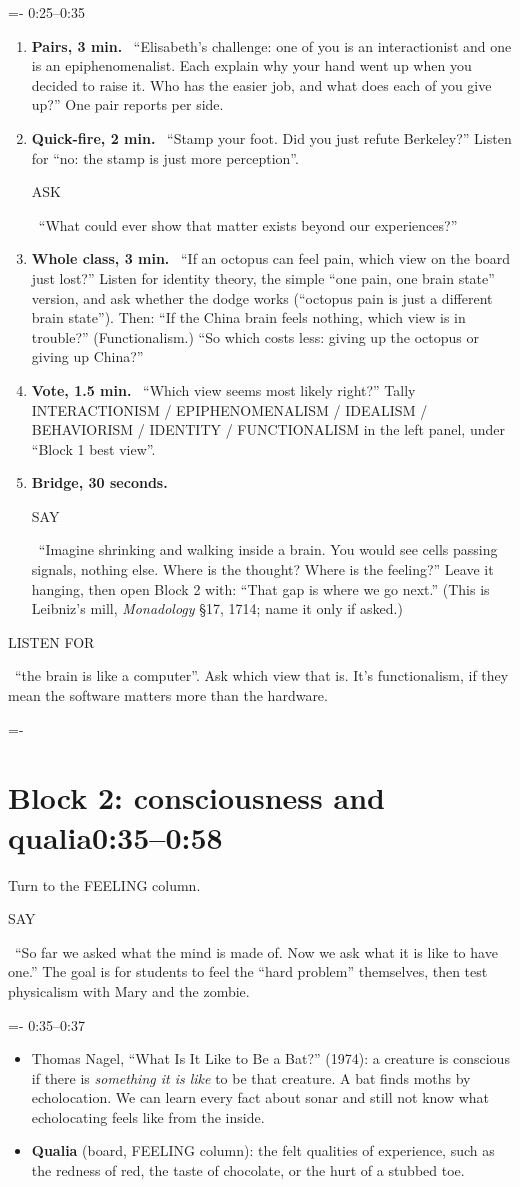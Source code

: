 \documentclass[11pt,letterpaper]{article}
\makeatletter
\newcommand{\keep}[1]{\par\penalty\z@\begingroup\dimen@=#1\relax\dimen@ii=\pagegoal\advance\dimen@ii-\pagetotal
  \ifdim\dimen@>\dimen@ii\ifdim\dimen@ii>\z@\vfil\break\fi\fi\endgroup}
\newcommand{\block}[2]{\keep{6\baselineskip}\section[#1]{#1\hfill{\normalsize\mdseries\color{muted}#2}}}
\newcommand{\beat}[2]{\keep{3\baselineskip}\vspace{5pt}\noindent{\sffamily\bfseries #1}\hfill{\sffamily\small\color{muted}#2}\par\nopagebreak\vspace{1pt}}
\newcommand{\tagbox}[1]{\colorbox{tagbg}{\sffamily\scriptsize\bfseries\color{accent}\strut #1}}
\newcommand{\say}{\tagbox{SAY}\ }
\newcommand{\ask}{\tagbox{ASK}\ }
\newcommand{\listen}{\tagbox{LISTEN FOR}\ }
\newcommand{\dur}[1]{\textsf{\bfseries\small #1.}\ }
\makeatother
\begin{document}
\beat{Discussion}{0:25--0:35}
\begin{enumerate}
\item \dur{Pairs, 3 min} ``Elisabeth's challenge: one of you is an interactionist and one is an epiphenomenalist. Each explain why your hand went up when you decided to raise it. Who has the easier job, and what does each of you give up?'' One pair reports per side.
\item \dur{Quick-fire, 2 min} ``Stamp your foot. Did you just refute Berkeley?'' Listen for ``no: the stamp is just more perception''. \ask ``What could ever show that matter exists beyond our experiences?''
\item \dur{Whole class, 3 min} ``If an octopus can feel pain, which view on the board just lost?'' Listen for identity theory, the simple ``one pain, one brain state'' version, and ask whether the dodge works (``octopus pain is just a different brain state''). Then: ``If the China brain feels nothing, which view is in trouble?'' (Functionalism.) ``So which costs less: giving up the octopus or giving up China?''
\item \dur{Vote, 1.5 min} ``Which view seems most likely right?'' Tally INTERACTIONISM / EPIPHENOMENALISM / IDEALISM / BEHAVIORISM / IDENTITY / FUNCTIONALISM in the left panel, under ``Block 1 best view''.
\item \dur{Bridge, 30 seconds} \say ``Imagine shrinking and walking inside a brain. You would see cells passing signals, nothing else. Where is the thought? Where is the feeling?'' Leave it hanging, then open Block 2 with: ``That gap is where we go next.'' (This is Leibniz's mill, \emph{Monadology} \S17, 1714; name it only if asked.)
\end{enumerate}
\listen ``the brain is like a computer''. Ask which view that is. It's functionalism, if they mean the software matters more than the hardware.

\block{Block 2: consciousness and qualia}{0:35--0:58}

Turn to the FEELING column. \say ``So far we asked what the mind is made of. Now we ask what it is like to have one.'' The goal is for students to feel the ``hard problem'' themselves, then test physicalism with Mary and the zombie.

\beat{What it is like (lecture)}{0:35--0:37}
\begin{itemize}
\item Thomas Nagel, ``What Is It Like to Be a Bat?'' (1974): a creature is conscious if there is \emph{something it is like} to be that creature. A bat finds moths by echolocation. We can learn every fact about sonar and still not know what echolocating feels like from the inside.
\item \textbf{Qualia} (board, FEELING column): the felt qualities of experience, such as the redness of red, the taste of chocolate, or the hurt of a stubbed toe.
\end{itemize}
\end{document}
